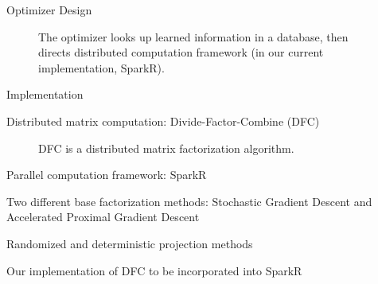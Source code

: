 \documentclass[final]{beamer}
\begin{document}
{\begin{frame}{}
\begin{center}
\begin{columns}[t]
\begin{column}{0.32\textwidth}
\begin{block}{\huge Optimizer Design}
\begin{center}
\begin{figure}
\caption[width=0.6\textwidth]{The optimizer looks up learned information in a database, then directs distributed computation framework (in our current implementation, SparkR).}
\end{figure}
\end{center}




\end{block}

\vspace{1.6cm}

    \begin{block}{\huge Implementation}

\vspace{.5cm}
\begin{itemize} {\Large
\item Distributed matrix computation: Divide-Factor-Combine (DFC)
\vspace{.2cm}
\begin{figure}
\caption[width=0.6\textwidth]{DFC is a distributed matrix factorization algorithm.}
\end{figure}
\vspace{.2cm}
\item Parallel computation framework: SparkR
\item Two different base factorization methods: Stochastic Gradient Descent and Accelerated Proximal Gradient Descent
\item Randomized and deterministic projection methods
\item Our implementation of DFC to be incorporated into SparkR}
\end{itemize}
\vspace{.5cm}


\end{block}
\end{column}
\end{columns}
\end{center}
\end{frame}}
\end{document}
